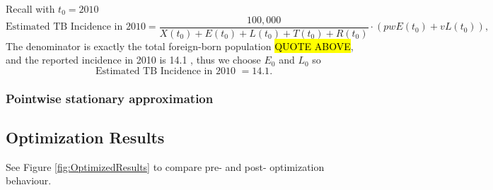 \documentclass[sn-mathphys,Numbered]{sn-jnl}%
\theoremstyle{thmstyleone}%
\theoremstyle{thmstyletwo}%
\theoremstyle{thmstylethree}%
\begin{document}
Recall with $t_0=2010$
  	$$\text{Estimated TB Incidence in 2010} = \frac{100,000}{X(t_0)+E(t_0)+L(t_0)+T(t_0)+R(t_0)} \cdot (pw E(t_0) + v L(t_0)) ,$$
The denominator is exactly the total foreign-born population \hl{QUOTE ABOVE}, and the reported incidence in 2010 is 14.1 \cite{MounchiliA.2022TuberculosisReport}, thus we choose $E_0$ and $L_0$ so $$\text{Estimated TB Incidence in 2010~} = 14.1. $$

\subsubsection{Pointwise stationary approximation}



\subsection{Optimization Results}

See Figure \ref{fig:OptimizedResults} to compare pre- and post- optimization behaviour.
\end{document}

